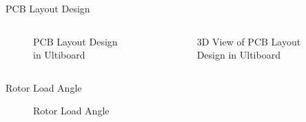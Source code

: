 \begin{frame}{PCB Layout Design}
	\begin{columns}
		\begin{figure}
			\centering
			\caption{PCB Layout Design in Ultiboard}
		\end{figure}
		\begin{figure}
			\centering
			\caption{3D View of PCB Layout Design in Ultiboard}
		\end{figure}
	\end{columns}
\end{frame}


\begin{frame}{Rotor Load Angle}
	\begin{figure}
		\centering
		\caption{Rotor Load Angle}
	\end{figure}
\end{frame}


